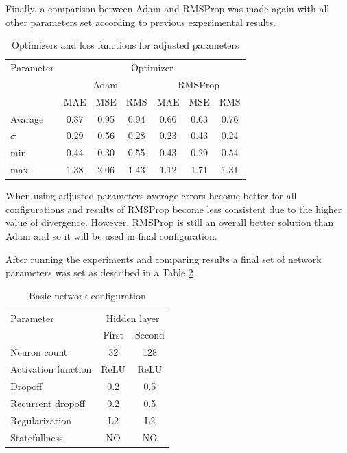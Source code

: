 \documentclass{kybernetika}
\begin{document}
Finally, a comparison between Adam and RMSProp was made again with all other parameters 
set according to previous experimental results.
\begin{table}[ht] 
	\centering
	\caption{Optimizers and loss functions for adjusted parameters}
	\label{tab:optimizers2}
	\begin{tabular}{l*{6}{c}}
		\hline
		\hline
		Parameter& \multicolumn{6}{c}{Optimizer}  \\
		&\multicolumn{3}{c}{Adam}&\multicolumn{3}{c}{RMSProp}\\
		\hline
		& MAE & MSE & RMS & MAE & MSE & RMS  \\
		Avarage & 0.87 & 0.95 & 0.94 & 0.66 & 0.63 & 0.76  \\
		$\sigma$ & 0.29 & 0.56 & 0.28 & 0.23 & 0.43 & 0.24  \\
		min & 0.44 & 0.30 & 0.55 & 0.43 & 0.29 & 0.54  \\
		max & 1.38 & 2.06 & 1.43 & 1.12 & 1.71 & 1.31  \\
		\hline
		\hline
	\end{tabular}
\end{table}
When using adjusted parameters average errors become better for all configurations and
results of RMSProp become less consistent due to the higher value of divergence.
However, RMSProp is still an overall better solution than Adam and so it will be used in final
configuration.

After running the experiments and comparing results a final set of network parameters was set
as described in a Table \ref{tab:final_config}.
\begin{table}[ht] 
	\centering
	\caption{Basic network configuration}
	\label{tab:final_config}
	\begin{tabular}{lcc}
		\hline
		\hline
		Parameter& \multicolumn{2}{c}{Hidden layer}  \\
		&First&Second\\
		\hline
		Neuron count & 32 & 128  \\
		Activation function & ReLU & ReLU  \\
		Dropoff & 0.2 & 0.5   \\
		Recurrent dropoff & 0.2 & 0.5   \\
		Regularization & L2 & L2   \\
		Statefullness & NO & NO   \\
		\hline
		\hline
	\end{tabular}
\end{table}

\end{document}
